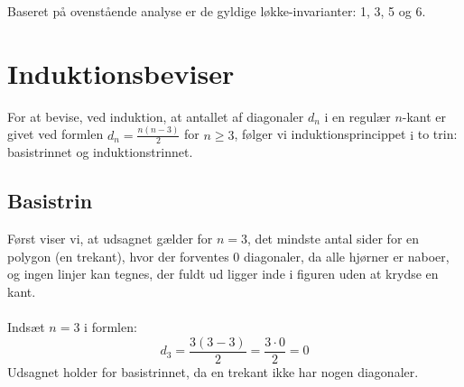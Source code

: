 \documentclass{article}
\begin{document}
Baseret på ovenstående analyse er de gyldige løkke-invarianter: 1, 3, 5 og 6.




\section{Induktionsbeviser}
For at bevise, ved induktion, at antallet af diagonaler $d_n$ i en regulær $n$-kant er givet ved formlen $d_n=\frac{n(n-3)}{2}$ for $n \geq 3$, følger vi induktionsprincippet $\mathrm{i}$ to trin: basistrinnet og induktionstrinnet.
\subsection{Basistrin}
Først viser vi, at udsagnet gælder for $n=3$, det mindste antal sider for en polygon (en trekant), hvor der forventes 0 diagonaler, da alle hjørner er naboer, og ingen linjer kan tegnes, der fuldt ud ligger inde i figuren uden at krydse en kant.
\\
\\
Indsæt $n=3$ i formlen:
$$
d_3=\frac{3(3-3)}{2}=\frac{3 \cdot 0}{2}=0
$$
Udsagnet holder for basistrinnet, da en trekant ikke har nogen diagonaler.
\end{document}
